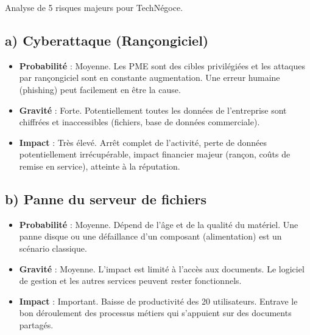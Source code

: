 \documentclass[a4paper,10pt]{article}
\newcommand{\notion}[1]{\textbf{\textcolor{mainBlue}{#1}}}
\newcommand{\definition}[1]{\textbf{\textcolor{softTeal}{#1}}}
\begin{document}
\begin{tcolorbox}[title=2) Identifier les risques majeurs]
    Analyse de 5 risques majeurs pour TechNégoce.

    \subsection*{a) Cyberattaque (Rançongiciel)}
    \begin{itemize}[leftmargin=*]
        \item \definition{Probabilité} : Moyenne. Les PME sont des cibles privilégiées et les attaques par rançongiciel sont en constante augmentation. Une erreur humaine (phishing) peut facilement en être la cause.
        \item \definition{Gravité} : Forte. Potentiellement toutes les données de l'entreprise sont chiffrées et inaccessibles (fichiers, base de données commerciale).
        \item \notion{Impact} : Très élevé. Arrêt complet de l'activité, perte de données potentiellement irrécupérable, impact financier majeur (rançon, coûts de remise en service), atteinte à la réputation.
    \end{itemize}

    \subsection*{b) Panne du serveur de fichiers}
    \begin{itemize}[leftmargin=*]
        \item \definition{Probabilité} : Moyenne. Dépend de l'âge et de la qualité du matériel. Une panne disque ou une défaillance d'un composant (alimentation) est un scénario classique.
        \item \definition{Gravité} : Moyenne. L'impact est limité à l'accès aux documents. Le logiciel de gestion et les autres services peuvent rester fonctionnels.
        \item \notion{Impact} : Important. Baisse de productivité des 20 utilisateurs. Entrave le bon déroulement des processus métiers qui s'appuient sur des documents partagés.
    \end{itemize}


\end{tcolorbox}
\end{document}
